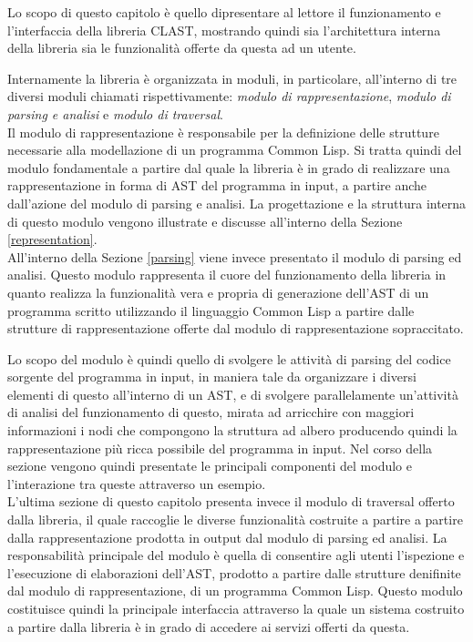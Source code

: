 \documentclass{book}
\begin{document}
Lo scopo di questo capitolo è quello dipresentare al lettore il funzionamento e
l'interfaccia della libreria CLAST, mostrando quindi sia l'architettura interna
della libreria sia le funzionalità offerte da questa ad un utente.

Internamente la libreria è organizzata in moduli, in particolare, all'interno di
tre diversi moduli chiamati rispettivamente: \textit{modulo di
rappresentazione}, \textit{modulo di parsing e analisi} e \textit{modulo di
traversal}.\\

Il modulo di rappresentazione è responsabile per la definizione delle strutture
necessarie alla modellazione di un programma Common Lisp. Si tratta quindi del
modulo fondamentale a partire dal quale la libreria è in grado di realizzare una
rappresentazione in forma di AST del programma in input, a partire anche
dall'azione del modulo di parsing e analisi. La progettazione e la struttura
interna di questo modulo vengono illustrate e discusse all'interno della Sezione
\ref{representation}.\\

All'interno della Sezione \ref{parsing} viene invece presentato il modulo di
parsing ed analisi. Questo modulo rappresenta il cuore del funzionamento della
libreria in quanto realizza la funzionalità vera e propria di generazione
dell'AST di un programma scritto utilizzando il linguaggio Common Lisp a partire
dalle strutture di rappresentazione offerte dal modulo di rappresentazione
sopraccitato.

Lo scopo del modulo è quindi quello di svolgere le attività di parsing del
codice sorgente del programma in input, in maniera tale da organizzare i diversi
elementi di questo all'interno di un AST, e di svolgere parallelamente
un'attività di analisi del funzionamento di questo, mirata ad arricchire con
maggiori informazioni i nodi che compongono la struttura ad albero producendo
quindi la rappresentazione più ricca possibile del programma in input. Nel corso
della sezione vengono quindi presentate le principali componenti del modulo e
l'interazione tra queste attraverso un esempio.\\

L'ultima sezione di questo capitolo presenta invece il modulo di traversal
offerto dalla libreria, il quale raccoglie le diverse funzionalità costruite a
partire a partire dalla rappresentazione prodotta in output dal modulo di
parsing ed analisi. La responsabilità principale del modulo è quella di
consentire agli utenti l'ispezione e l'esecuzione di elaborazioni dell'AST,
prodotto a partire dalle strutture denifinite dal modulo di rappresentazione, di
un programma Common Lisp. Questo modulo costituisce quindi la principale
interfaccia attraverso la quale un sistema costruito a partire dalla libreria è
in grado di accedere ai servizi offerti da questa.
\end{document}
